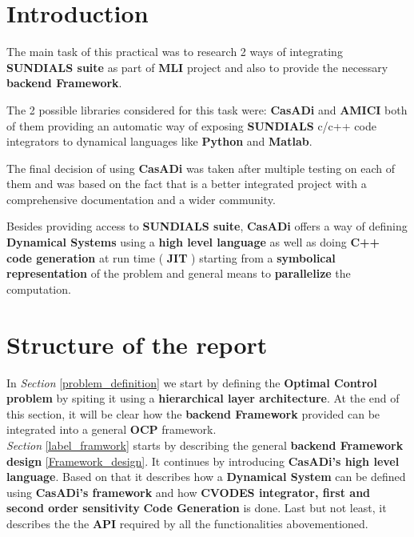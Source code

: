 \documentclass[12pt, letterpaper]{article}
\begin{document}
\section{Introduction}
The main task of this practical was to research 2 ways of integrating \textbf{SUNDIALS suite} as part of \textbf{MLI}  project and also to provide the necessary  \textbf{backend Framework}.

The 2 possible libraries considered for this task were: \textbf{CasADi} \cite{Andersson2018} and \textbf{AMICI} \cite{frohlich2020amici} both of them providing an automatic way of exposing \textbf{SUNDIALS} c/c++ code integrators to dynamical languages like \textbf{Python} and \textbf{Matlab}.

The final decision of using \textbf{CasADi} was taken after multiple testing on each of them and was based on the fact that is a better integrated project with a comprehensive documentation and a wider community. 


Besides providing access to \textbf{SUNDIALS suite}, \textbf{CasADi} offers a way of defining \textbf{Dynamical Systems} using a \textbf{high level language} as well as doing \textbf{C++ code generation} at run time ( \textbf{JIT} ) starting from a \textbf{symbolical representation} of the problem and general means to \textbf{parallelize} the computation.
 
\section{Structure of the report}


In \textit{Section} \ref{problem_definition} we start by defining the \textbf{Optimal Control problem} by spiting it using a \textbf{hierarchical layer architecture}. At the end of this section, it will be clear how the \textbf{backend Framework} provided can be integrated into a general \textbf{OCP} framework.\\



\textit{Section} \ref{label_framwork} starts by describing the general \textbf{backend Framework design} \ref{Framework_design}. It continues by introducing \textbf{CasADi's high level language}. Based on that it describes how a \textbf{Dynamical System} can be defined using \textbf{CasADi's framework} and how \textbf{CVODES integrator, first and second order sensitivity}   \textbf{Code Generation} is done. 
Last but not least, it describes the the \textbf{API} required by all the functionalities abovementioned.\\
\end{document}
